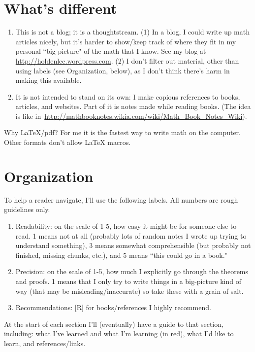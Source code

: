 \section{What's different}
\begin{enumerate}
\item
This is not a blog; it is a thoughtstream. (1) In a blog, I could write up math articles nicely, but it's harder to show/keep track of where they fit in my personal ``big picture" of the math that I know. See my blog at \url{http://holdenlee.wordpress.com}. (2) I don't filter out material, other than using labels (see Organization, below), as I don't think there's harm in making this available.
\item
It is not intended to stand on its own: I make copious references to books, articles, and websites. Part of it is notes made while reading books. (The idea is like in~\url{http://mathbooknotes.wikia.com/wiki/Math_Book_Notes_Wiki}).
\end{enumerate}
Why LaTeX/pdf? For me it is the fastest way to write math on the computer. Other formats don't allow LaTeX macros.

\section{Organization}

To help a reader navigate, I'll use the following labels. All numbers are rough guidelines only.
\begin{enumerate}
\item
Readability: on the scale of 1-5, how easy it might be for someone else to read. 1 means not at all (probably lots of random notes I wrote up trying to understand something), 3 means somewhat comprehensible (but probably not finished, missing chunks, etc.), and 5 means ``this could go in a book."
\item
Precision: on the scale of 1-5, how much I explicitly go through the theorems and proofs. 1 means that I only try to write things in a big-picture kind of way (that may be misleading/inaccurate) so take these with a grain of salt.
\item 
Recommendations: [R] for books/references I highly recommend.
\end{enumerate}
At the start of each section I'll (eventually) have a guide to that section, including: what I've learned and what I'm learning (in red), what I'd like to learn, and references/links.

